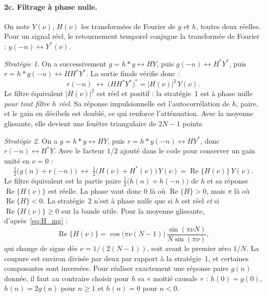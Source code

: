 \documentclass[11pt,a4paper]{article}
\begin{document}
\paragraph{2c. Filtrage à phase nulle.}
On note $Y(\nu)$, $H(\nu)$ les transformées de Fourier de $y$ et $h$, toutes deux réelles. Pour un signal réel, le retournement temporel conjugue la transformée de Fourier : $y(-n) \leftrightarrow Y^*(\nu)$.

\emph{Stratégie 1.} On a successivement $g = h * y \leftrightarrow H Y$, puis $g(-n) \leftrightarrow H^* Y^*$, puis $r = h * g(-n) \leftrightarrow H H^* Y^*$. La sortie finale vérifie donc :
\begin{equation}
  r(-n) \;\leftrightarrow\; \big(H H^* Y^*\big)^* = |H(\nu)|^2\, Y(\nu).
  \label{eq:strat1}
\end{equation}
Le filtre équivalent $|H(\nu)|^2$ est réel et positif : la stratégie~1 est à phase nulle \emph{pour tout filtre $h$ réel}. Sa réponse impulsionnelle est l'autocorrélation de $h$, paire, et le gain en décibels est doublé, ce qui renforce l'atténuation. Avec la moyenne glissante, elle devient une fenêtre triangulaire de $2N-1$ points.

\emph{Stratégie 2.} On a $g = h * y \leftrightarrow H Y$, puis $r = h * y(-n) \leftrightarrow H Y^*$, donc $r(-n) \leftrightarrow H^* Y$. Avec le facteur $1/2$ ajouté dans le code pour conserver un gain unité en $\nu = 0$ :
\begin{equation}
  \tfrac{1}{2}\big(g(n) + r(-n)\big) \;\leftrightarrow\; \tfrac{1}{2}\big(H(\nu) + H^*(\nu)\big)\, Y(\nu) = \operatorname{Re}\{H(\nu)\}\, Y(\nu).
  \label{eq:strat2}
\end{equation}
Le filtre équivalent est la partie paire $\frac{1}{2}\big(h(n) + h(-n)\big)$ de $h$ et sa réponse $\operatorname{Re}\{H(\nu)\}$ est réelle. La phase vaut donc 0 là où $\operatorname{Re}\{H\} > 0$, mais $\pi$ là où $\operatorname{Re}\{H\} < 0$. La stratégie~2 n'est à phase nulle que si $h$ est réel \emph{et} si $\operatorname{Re}\{H(\nu)\} \geq 0$ sur la bande utile. Pour la moyenne glissante, d'après~\eqref{eq:H_mg} :
\begin{equation}
  \operatorname{Re}\{H(\nu)\} = \cos\big(\pi\nu(N-1)\big)\, \frac{\sin(\pi\nu N)}{N\sin(\pi\nu)},
\end{equation}
qui change de signe dès $\nu = 1/(2(N-1))$, soit avant le premier zéro $1/N$. La coupure est environ divisée par deux par rapport à la stratégie~1, et certaines composantes sont inversées. Pour réaliser exactement une réponse paire $g(n)$ donnée, il faut au contraire choisir pour $h$ sa « moitié causale » : $h(0) = g(0)$, $h(n) = 2g(n)$ pour $n \geq 1$ et $h(n) = 0$ pour $n < 0$.
\end{document}
